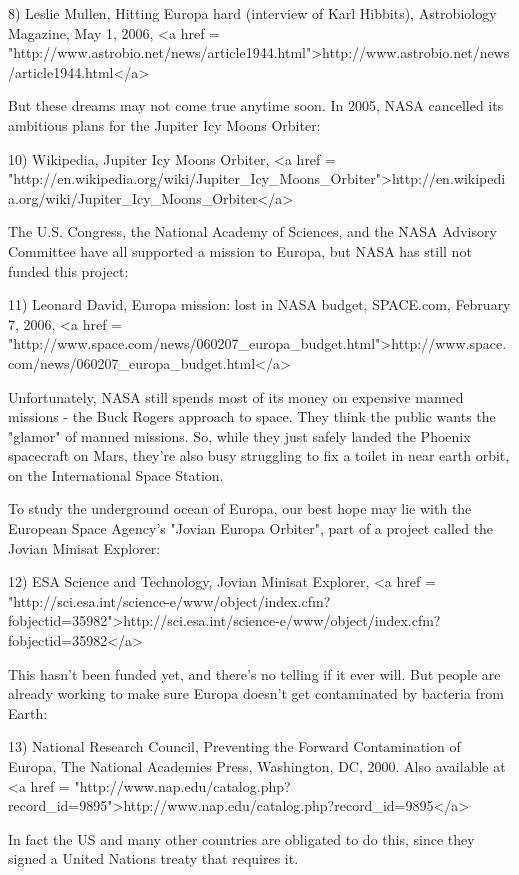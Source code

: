 8) Leslie Mullen, Hitting Europa hard (interview of Karl Hibbits), 
Astrobiology Magazine, May 1, 2006, 
<a href = "http://www.astrobio.net/news/article1944.html">http://www.astrobio.net/news/article1944.html</a>

But these dreams may not come true anytime soon.  In 2005, NASA
cancelled its ambitious plans for the Jupiter Icy Moons Orbiter:

10) Wikipedia, Jupiter Icy Moons Orbiter, 
<a href = "http://en.wikipedia.org/wiki/Jupiter_Icy_Moons_Orbiter">http://en.wikipedia.org/wiki/Jupiter_Icy_Moons_Orbiter</a>

The U.S. Congress, the National Academy of Sciences, and the 
NASA Advisory Committee have all supported a mission to Europa, 
but NASA has still not funded this project:

11) Leonard David, Europa mission: lost in NASA budget, SPACE.com,
February 7, 2006, <a href = "http://www.space.com/news/060207_europa_budget.html">http://www.space.com/news/060207_europa_budget.html</a>

Unfortunately, NASA still spends most of its money on expensive
manned missions - the Buck Rogers approach to space.  
They think the public wants the "glamor" of manned missions.
So, while they just safely landed the Phoenix spacecraft on 
Mars, they're also busy struggling to fix a toilet in near earth
orbit, on the International Space Station.  

To study the underground ocean of Europa, 
our best hope may lie with the European Space Agency's "Jovian Europa
Orbiter", part of a project called the Jovian Minisat Explorer:

12) ESA Science and Technology, Jovian Minisat Explorer,
<a href = "http://sci.esa.int/science-e/www/object/index.cfm?fobjectid=35982">http://sci.esa.int/science-e/www/object/index.cfm?fobjectid=35982</a>

This hasn't been funded yet, and there's no telling if it ever
will.  But people are already working to make sure Europa
doesn't get contaminated by bacteria from Earth:

13) National Research Council, Preventing the Forward Contamination 
of Europa, The National Academies Press, Washington, DC, 2000.  
Also available at <a href = "http://www.nap.edu/catalog.php?record_id=9895">http://www.nap.edu/catalog.php?record_id=9895</a>

In fact the US and many other countries are obligated to do this, 
since they signed a United Nations treaty that requires it.

